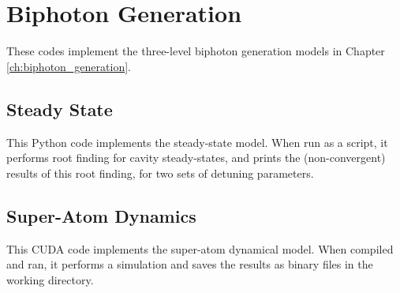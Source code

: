 \section{Biphoton Generation}
These codes implement the three-level biphoton generation models in Chapter \ref{ch:biphoton_generation}.

\subsection{Steady State}
This Python code implements the steady-state model. When run as a script, it performs root finding for cavity steady-states, and prints the (non-convergent) results of this root finding, for two sets of detuning parameters.


\subsection{Super-Atom Dynamics}
This CUDA code implements the super-atom dynamical model. When compiled and ran, it performs a simulation and saves the results as binary files in the working directory.

